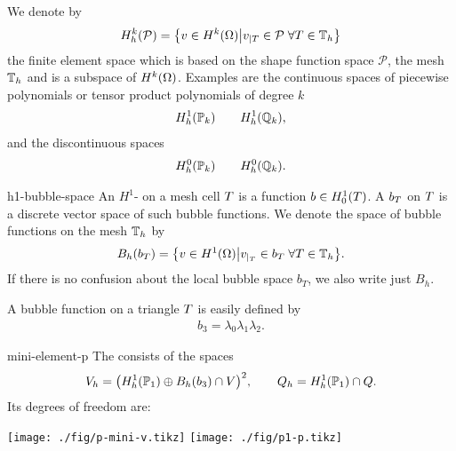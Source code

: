 \begin{Notation}
  We denote by
  \begin{gather}
    \label{eq:stokes:8}
    H^k_h(\mathcal P) =
    \bigl\{ v\in H^k(\Omega) \big\vert
    v_{|\cell} \in \mathcal P \;\forall \cell\in\mesh_h\bigr\}
  \end{gather}
  the finite element space which is based on the shape function space
  $\mathcal P$, the mesh $\mesh_h$ and is a subspace of
  $H^k(\domain)$. Examples are the continuous spaces of piecewise
  polynomials or tensor product polynomials of degree $k$
  \begin{gather*}
    H^1_h(\P_k) \qquad H^1_h(\Q_k),
  \end{gather*}
  and the discontinuous spaces
  \begin{gather*}
    H^0_h(\P_k) \qquad H^0_h(\Q_k).
  \end{gather*}
\end{Notation}

\begin{Definition}{h1-bubble-space}
  An $H^1$- on a mesh cell $\cell$ is a
  function $b\in H^1_0(\cell)$. A  $b_\cell$ on
  $\cell$ is a discrete vector space of such bubble functions.  We
  denote the space of bubble functions on the mesh $\mesh_h$ by
  \begin{gather*}
    B_h(b_\cell) = \bigl\{ v\in H^1(\domain) \big\vert
    v_{|_\cell} \in b_\cell \;\forall \cell\in\mesh_h
    \bigr\}.
  \end{gather*}
  If there is no confusion about the local bubble space $b_T$, we also
  write just $B_h$.
\end{Definition}

\begin{example}
  A bubble function on a triangle $\cell$ is easily defined by
  \begin{gather}
    \label{eq:stokes:7}
    b_3 = \lambda_0\lambda_1\lambda_2.
  \end{gather}
\end{example}

\begin{Definition}{mini-element-p}
  The  consists of the spaces
  \begin{gather}
    V_h = \bigl(H^1_h(\P_1) \oplus B_h(b_3) \cap V\bigr)^2,
    \qquad
    Q_h = H^1_h(\P_1) \cap Q.
  \end{gather}
  Its degrees of freedom are:
  \begin{center}
    \texttt{[image: ./fig/p-mini-v.tikz]}
    \hspace{1cm}
    \texttt{[image: ./fig/p1-p.tikz]}
  \end{center}
\end{Definition}

